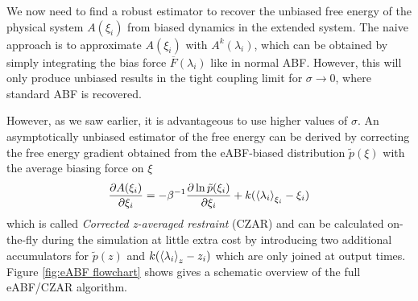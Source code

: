 We now need to find a robust estimator to recover the unbiased free energy of the physical system $A(\xi_i)$ from biased dynamics in the extended system.
The naive approach is to approximate $A(\xi_i)$ with $A^k(\lambda_i)$, which can be obtained by simply integrating the bias force $\overline{F}(\lambda_{i})$ like in normal ABF.
However, this will only produce unbiased results in the tight coupling limit for $\sigma \rightarrow 0$, where standard ABF is recovered.

However, as we saw earlier, it is advantageous to use higher values of $\sigma$.
An asymptotically unbiased estimator of the free energy can be derived by correcting the free energy gradient obtained from the eABF-biased distribution $\tilde{p}(\xi)$ with the average biasing force on $\xi$
\begin{equation}
  \frac{\partial A(\xi_i)}{\partial \xi_i} = -\beta^{-1}\frac{\partial \ln \tilde{p}(\xi_i)}{\partial \xi_i} + k(\braket{\lambda_i}_{\xi_i}-\xi_{i}) \label{eq:CZAR}
\end{equation}
which is called \textit{Corrected z-averaged restraint} (CZAR) and can be calculated on-the-fly during the simulation at little extra cost by introducing two additional accumulators for $\tilde{p}(z)$ and $k(\braket{\lambda_i}_{z}-z_{i})$ which are only joined at output times.\autocite{lesage2017smoothed} Figure \ref{fig:eABF flowchart} shows gives a schematic overview of the full eABF/CZAR algorithm.


